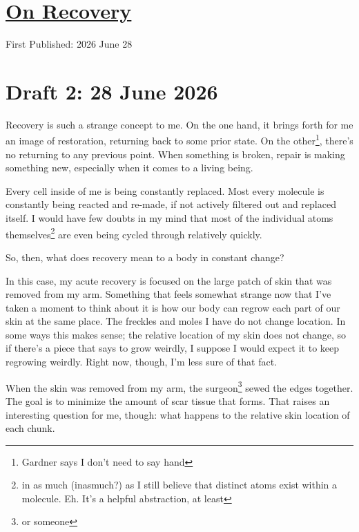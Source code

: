\documentclass[12pt]{article}
\renewcommand{\,}{\textsuperscript{,}}
\begin{document}
  
\doublespacing  
\section{\href{recovery.html}{On Recovery}}  
First Published: 2026 June 28

\section{Draft 2: 28 June 2026}

Recovery is such a strange concept to me.  
On the one hand, it brings forth for me an image of restoration, returning back to some prior state.  
On the other\footnote{Gardner says I don't need to say hand}, there's no returning to any previous point.  
When something is broken, repair is making something new, especially when it comes to a living being.

Every cell inside of me is being constantly replaced.  
Most every molecule is constantly being reacted and re-made, if not actively filtered out and replaced itself.  
I would have few doubts in my mind that most of the individual atoms themselves\footnote{in as much (inasmuch?) as I still believe that distinct atoms exist within a molecule. Eh. It's a helpful abstraction, at least} are even being cycled through relatively quickly.

So, then, what does recovery mean to a body in constant change?

In this case, my acute recovery is focused on the large patch of skin that was removed from my arm.  
Something that feels somewhat strange now that I've taken a moment to think about it is how our body can regrow each part of our skin at the same place.  
The freckles and moles I have do not change location.  
In some ways this makes sense; the relative location of my skin does not change, so if there's a piece that says to grow weirdly, I suppose I would expect it to keep regrowing weirdly.  
Right now, though, I'm less sure of that fact.

When the skin was removed from my arm, the surgeon\footnote{or someone} sewed the edges together.  
The goal is to minimize the amount of scar tissue that forms.  
That raises an interesting question for me, though: what happens to the relative skin location of each chunk.
\end{document}
